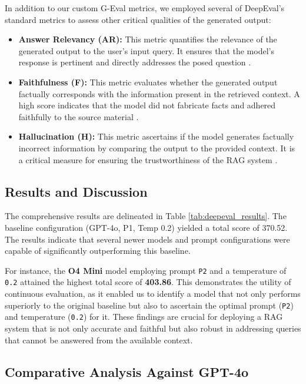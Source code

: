 In addition to our custom G-Eval metrics, we employed several of DeepEval's standard metrics to assess other critical qualities of the generated output:
\begin{itemize}
    \item \textbf{Answer Relevancy (AR):} This metric quantifies the relevance of the generated output to the user's input query. It ensures that the model's response is pertinent and directly addresses the posed question \autocite{deepeval2023}.
    \item \textbf{Faithfulness (F):} This metric evaluates whether the generated output factually corresponds with the information present in the retrieved context. A high score indicates that the model did not fabricate facts and adhered faithfully to the source material \autocite{deepeval2023}.
    \item \textbf{Hallucination (H):} This metric ascertains if the model generates factually incorrect information by comparing the output to the provided context. It is a critical measure for ensuring the trustworthiness of the RAG system \autocite{deepeval2023}.
\end{itemize}


\subsection{Results and Discussion}
The comprehensive results are delineated in Table \ref{tab:deepeval_results}. The baseline configuration (GPT-4o, P1, Temp 0.2) yielded a total score of 370.52. The results indicate that several newer models and prompt configurations were capable of significantly outperforming this baseline.

For instance, the \textbf{O4 Mini} model employing prompt \texttt{P2} and a temperature of \texttt{0.2} attained the highest total score of \textbf{403.86}. This demonstrates the utility of continuous evaluation, as it enabled us to identify a model that not only performs superiorly to the original baseline but also to ascertain the optimal prompt (\texttt{P2}) and temperature (\texttt{0.2}) for it. These findings are crucial for deploying a RAG system that is not only accurate and faithful but also robust in addressing queries that cannot be answered from the available context.



\subsection{Comparative Analysis Against GPT-4o}
\label{sec:comparative_analysis_gpt4o}

